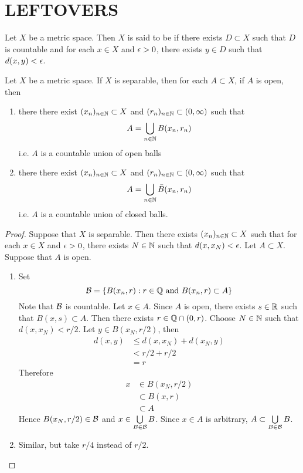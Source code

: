 \documentclass{book}
\begin{document}
\newpage
\section{LEFTOVERS}
\begin{defn}
	Let $X$ be a metric space. Then $X$ is said to be  if there exists $D \subset X$ such that $D$ is countable and for each $x \in X$ and $\epsilon >0$, there exists $y \in D$ such that $d(x, y) < \epsilon$.
\end{defn}

\begin{ex}
	Let $X$ be a metric space. If $X$ is separable, then for each $A \subset X$, if $A$ is open, then 
	\begin{enumerate}
		\item there there exist $(x_n)_{n \in \mathbb{N}} \subset X$ and $(r_n)_{n \in \mathbb{N}} \subset (0, \infty)$ such that $$A = \bigcup\limits_{n \in \mathbb{N}} B(x_n, r_n)$$
		i.e. $A$ is a countable union of open balls
		\item there there exist $(x_n)_{n \in \mathbb{N}} \subset X$ and $(r_n)_{n \in \mathbb{N}} \subset (0, \infty)$ such that $$A = \bigcup\limits_{n \in \mathbb{N}} \bar{B}(x_n, r_n)$$
		i.e. $A$ is a countable union of closed balls.
	\end{enumerate}
\end{ex}

\begin{proof}
	Suppose that $X$ is separable. Then there exists $(x_n)_{n \in \mathbb{N}} \subset X$ such that for each $x \in X$ and $\epsilon >0$, there exists $N \in \mathbb{N}$ such that $d(x, x_N) < \epsilon$. Let $A \subset X$. Suppose that $A$ is open.
	\begin{enumerate}
		\item  Set 
		$$\mathcal{B} = \{B(x_n, r): r \in \mathbb{Q} \text{ and } B(x_n, r) \subset A\}$$ 
		Note that $\mathcal{B}$ is countable. Let $x \in A$. Since $A$ is open, there exists $s \in \mathbb{R}$ such that $B(x, s) \subset A$. Then there exists  $r \in \mathbb{Q} \cap (0, r)$. Choose $N \in \mathbb{N}$ such that $d(x, x_N) < r/2$. Let $y \in B(x_N, r/2)$, then 
		\begin{align*}
			d(x, y) 
			& \leq d(x, x_N) + d(x_N, y) \\
			& < r/2 + r/2 \\
			& = r
		\end{align*}
		Therefore 
		\begin{align*}
			x 
			& \in B(x_N, r/2) \\
			& \subset B(x, r) \\
			& \subset A
		\end{align*}
		Hence $B(x_N, r/2) \in \mathcal{B}$ and $x \in \bigcup\limits_{B \in \mathcal{B}}B$. Since $x \in A$ is arbitrary, $A \subset \bigcup\limits_{B \in \mathcal{B}}B$.
		\item Similar, but take $r/4$ instead of $r/2$.
	\end{enumerate}
\end{proof}
\end{document}
